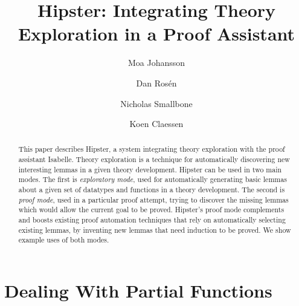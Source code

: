 \documentclass{llncs}
\begin{document}
\title{Hipster: Integrating Theory Exploration in a Proof Assistant}

\author{Moa Johansson \and Dan Ros\'en \and Nicholas Smallbone \and Koen Claessen}


\maketitle

\begin{abstract}

This paper describes Hipster, a system integrating theory exploration with the proof assistant Isabelle. Theory exploration is a technique for automatically discovering new interesting lemmas in a given theory development.
Hipster can be used in two main modes. The first is {\em exploratory mode}, used for automatically generating basic lemmas about a given set of datatypes and functions in a theory development. The second is {\em proof mode}, used in a particular proof attempt, trying to discover the missing lemmas which would allow the current goal to be proved. Hipster's proof mode complements and boosts existing proof automation techniques that rely on automatically selecting existing lemmas, by inventing new lemmas that need induction to be proved. We show example uses of both modes.
\end{abstract}








\section{Dealing With Partial Functions}
\label{sec:partial}









\end{document}
